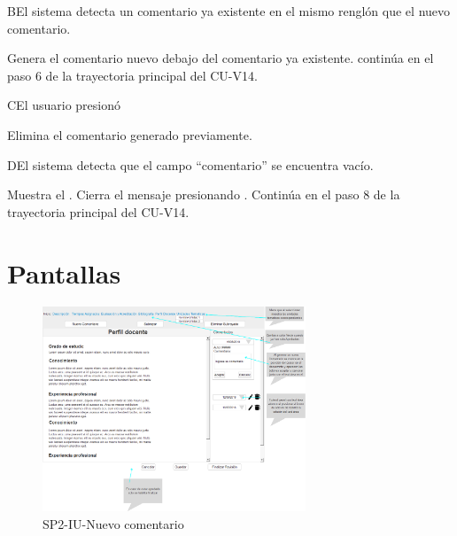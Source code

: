 \label{SP2-CU14-B}
\begin{UCtrayectoriaA}{B}{El sistema detecta un comentario ya existente en el mismo renglón que el nuevo comentario.}

    \UCpaso Genera el comentario nuevo debajo del comentario ya existente. 
    \UCpaso continúa en el paso 6 de la trayectoria principal del CU-V14.
\end{UCtrayectoriaA}

\label{SP2-CU14-C}
\begin{UCtrayectoriaA}{C}{El usuario presionó }

	\UCpaso Elimina el comentario generado previamente.
\end{UCtrayectoriaA}

\label{SP2-CU14-D}
\begin{UCtrayectoriaA}{D}{El sistema detecta que el campo “comentario” se encuentra vacío.} 

	\UCpaso Muestra el .
    \UCpaso[\UCactor] Cierra el mensaje presionando .
    \UCpaso Continúa en el paso 8 de la trayectoria principal del CU-V14.
\end{UCtrayectoriaA}

\chapter{Pantallas}
 \begin{figure}
  \centering
    \includegraphics[width=0.7\textwidth]{DCU/SP2/Pantallas/Nuevo_comentario}
  \caption{SP2-IU-Nuevo comentario}
  \label{SP2-IU-Nuevo_comentario}
\end{figure}
